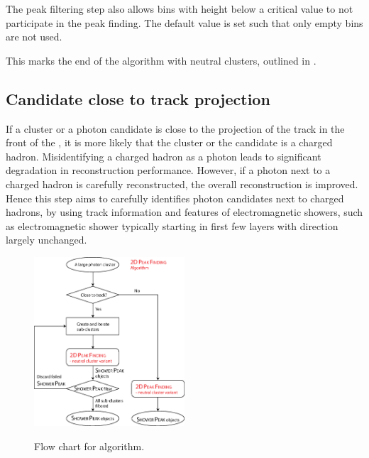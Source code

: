 The peak filtering step also allows bins with height below a critical value to not participate in the peak finding. The default value is set such that only empty bins are not used.

This marks the end of the \PhotonReconstruction algorithm with neutral clusters, outlined in .

\subsection{Candidate close to track projection}
\label{sec:photon2Dtrack}
If a cluster or a photon candidate is close to the projection of the track in the front of the \ECAL, it is more likely that the cluster or the candidate is a charged hadron. Misidentifying a charged hadron as a photon leads to significant degradation in reconstruction performance. However, if a photon next to a charged hadron is carefully reconstructed, the overall reconstruction is improved. Hence this step aims to carefully identifies photon candidates next to charged hadrons, by using track information and features of electromagnetic showers, such as electromagnetic shower typically starting in first few layers with direction largely unchanged.

\begin{figure}[tbph]
\centering
{\includegraphics[width=0.5\textwidth]{photon/2DpeakFindingTrack}}
\caption[Flow chart for \peakFinding algorithm.]
{Flow chart for \peakFinding algorithm.}
\label{fig:photonPeakFindingFlow}
\end{figure}

